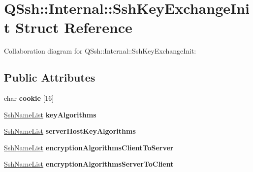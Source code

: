 \hypertarget{struct_q_ssh_1_1_internal_1_1_ssh_key_exchange_init}{}\section{Q\+Ssh\+:\+:Internal\+:\+:Ssh\+Key\+Exchange\+Init Struct Reference}
\label{struct_q_ssh_1_1_internal_1_1_ssh_key_exchange_init}


Collaboration diagram for Q\+Ssh\+:\+:Internal\+:\+:Ssh\+Key\+Exchange\+Init\+:
\subsection*{Public Attributes}
\begin{DoxyCompactItemize}
\item 
\mbox{\label{struct_q_ssh_1_1_internal_1_1_ssh_key_exchange_init_a5c2488126332e2d4208cb436e9d124e3}} 
char {\bfseries cookie} \mbox{[}16\mbox{]}
\item 
\mbox{\label{struct_q_ssh_1_1_internal_1_1_ssh_key_exchange_init_a0836356495b3e0933bdfe7b0dad63433}} 
\mbox{\hyperlink{struct_q_ssh_1_1_internal_1_1_ssh_name_list}{Ssh\+Name\+List}} {\bfseries key\+Algorithms}
\item 
\mbox{\label{struct_q_ssh_1_1_internal_1_1_ssh_key_exchange_init_ad330334411f74c0ca0dccd0c689814d6}} 
\mbox{\hyperlink{struct_q_ssh_1_1_internal_1_1_ssh_name_list}{Ssh\+Name\+List}} {\bfseries server\+Host\+Key\+Algorithms}
\item 
\mbox{\label{struct_q_ssh_1_1_internal_1_1_ssh_key_exchange_init_ab8369115156dcb01d5b361166a2f1c57}} 
\mbox{\hyperlink{struct_q_ssh_1_1_internal_1_1_ssh_name_list}{Ssh\+Name\+List}} {\bfseries encryption\+Algorithms\+Client\+To\+Server}
\item 
\mbox{\label{struct_q_ssh_1_1_internal_1_1_ssh_key_exchange_init_a642e11ef820a5e03691cea5a507824ec}} 
\mbox{\hyperlink{struct_q_ssh_1_1_internal_1_1_ssh_name_list}{Ssh\+Name\+List}} {\bfseries encryption\+Algorithms\+Server\+To\+Client}

\end{DoxyCompactItemize}
